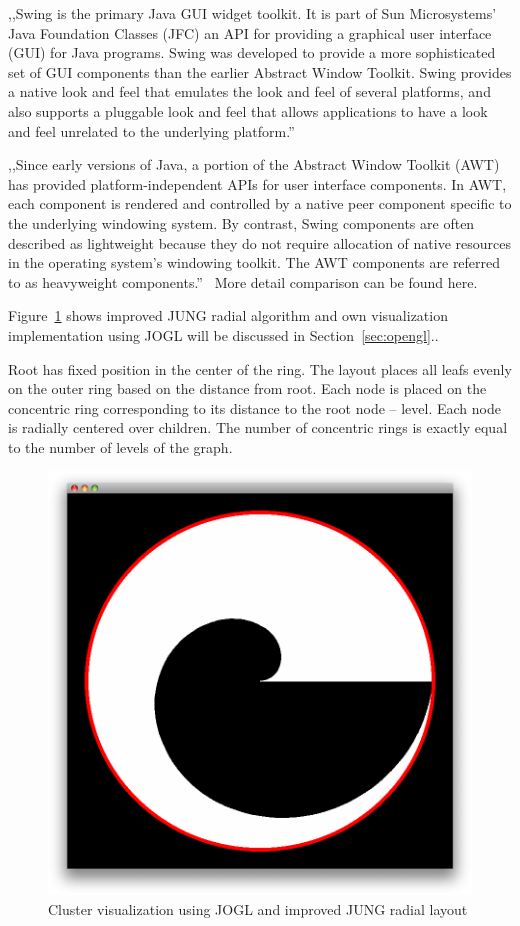 ,,Swing is the primary Java GUI widget toolkit. It is part of Sun Microsystems' Java Foundation Classes (JFC) an API for providing a graphical user interface (GUI) for Java programs.
Swing was developed to provide a more sophisticated set of GUI components than the earlier Abstract Window Toolkit. Swing provides a native look and feel that emulates the look and feel of several platforms, and also supports a pluggable look and feel that allows applications to have a look and feel unrelated to the underlying platform.''~\cite{JAVA_SWING}


,,Since early versions of Java, a portion of the Abstract Window Toolkit (AWT) has provided platform-independent APIs for user interface components. In AWT, each component is rendered and controlled by a native peer component specific to the underlying windowing system.
By contrast, Swing components are often described as lightweight because they do not require allocation of native resources in the operating system's windowing toolkit. The AWT components are referred to as heavyweight components.''~\cite{JAVA_SWING} More detail comparison can be found here.~\cite{AWT_VS_SWING}


Figure~\ref{fig:cluster_jogl_impl} shows improved JUNG radial algorithm and own visualization implementation using JOGL will be discussed in Section~\ref{sec:opengl}..

Root has fixed position in the center of the ring. The layout places all leafs evenly on the outer ring based on the distance from root. Each node is placed on the concentric ring corresponding to its distance to the root node -- level. Each node is radially centered over children. The number of concentric rings is exactly equal to the number of levels of the graph.


\begin{figure}[h!]
\centering
\includegraphics[scale=0.4]{pictures/cluster_jogl_impl.png}
\caption{Cluster visualization using JOGL and improved JUNG radial layout}
\label{fig:cluster_jogl_impl}
\end{figure}


